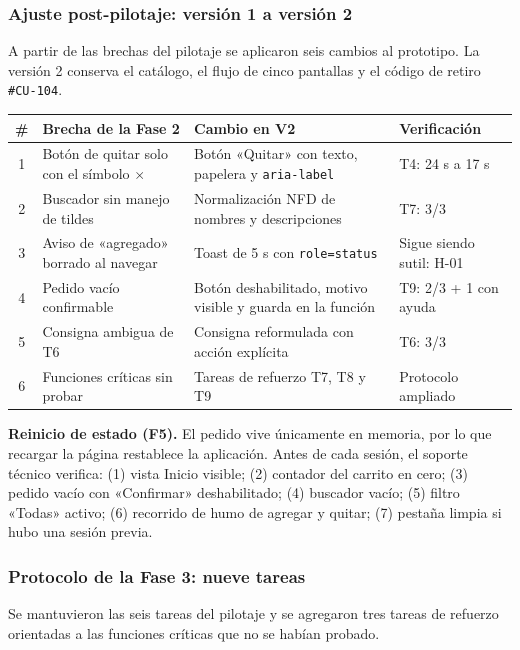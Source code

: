 \documentclass{article}
\begin{document}
\subsubsection{Ajuste post-pilotaje: versión 1 a versión 2}
A partir de las brechas del pilotaje se aplicaron seis cambios al prototipo. La versión 2 conserva el catálogo, el flujo de cinco pantallas y el código de retiro \texttt{\#CU-104}.

\begin{center}
\small
\begin{tabular}{|c|p{4.4cm}|p{5.2cm}|p{3.2cm}|}
\hline
\textbf{\#} & \textbf{Brecha de la Fase 2} & \textbf{Cambio en V2} & \textbf{Verificación} \\
\hline
1 & Botón de quitar solo con el símbolo $\times$ & Botón «Quitar» con texto, papelera y \texttt{aria-label} & T4: 24 s a 17 s \\
\hline
2 & Buscador sin manejo de tildes & Normalización NFD de nombres y descripciones & T7: 3/3 \\
\hline
3 & Aviso de «agregado» borrado al navegar & Toast de 5 s con \texttt{role=status} & Sigue siendo sutil: H-01 \\
\hline
4 & Pedido vacío confirmable & Botón deshabilitado, motivo visible y guarda en la función & T9: 2/3 + 1 con ayuda \\
\hline
5 & Consigna ambigua de T6 & Consigna reformulada con acción explícita & T6: 3/3 \\
\hline
6 & Funciones críticas sin probar & Tareas de refuerzo T7, T8 y T9 & Protocolo ampliado \\
\hline
\end{tabular}
\end{center}

\textbf{Reinicio de estado (F5).} El pedido vive únicamente en memoria, por lo que recargar la página restablece la aplicación. Antes de cada sesión, el soporte técnico verifica: (1) vista Inicio visible; (2) contador del carrito en cero; (3) pedido vacío con «Confirmar» deshabilitado; (4) buscador vacío; (5) filtro «Todas» activo; (6) recorrido de humo de agregar y quitar; (7) pestaña limpia si hubo una sesión previa.

\subsubsection{Protocolo de la Fase 3: nueve tareas}
Se mantuvieron las seis tareas del pilotaje y se agregaron tres tareas de refuerzo orientadas a las funciones críticas que no se habían probado.
\end{document}
